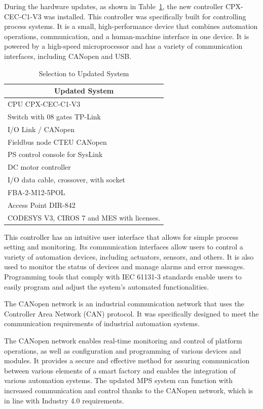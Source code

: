 \documentclass[journal]{IEEEtran}
\begin{document}
During the hardware updates, as shown in Table~\ref{tab:step3}, the new controller CPX-CEC-C1-V3 was installed. This controller was specifically built for controlling process systems. It is a small, high-performance device that combines automation operations, communication, and a human-machine interface in one device. It is powered by a high-speed microprocessor and has a variety of communication interfaces, including CANopen and USB.

\begin{table}[]
\caption{Selection to Updated System}
\label{tab:step3}
\begin{tabular}{l}
\hline
\multicolumn{1}{c}{\textbf{Updated System}} \\ \hline
CPU CPX-CEC-C1-V3                           \\
Switch with 08 gates TP-Link                \\
I/O Link / CANopen                          \\
Fieldbus node CTEU CANopen                  \\
PS control console for SysLink              \\
DC motor controller                         \\
I/O data cable, crossover, with socket      \\
FBA-2-M12-5POL                              \\
Access Point DIR-842                        \\
CODESYS V3, CIROS 7 and MES with licenses.  \\ \hline
\end{tabular}
\end{table}

This controller has an intuitive user interface that allows for simple process setting and monitoring. Its communication interfaces allow users to control a variety of automation devices, including actuators, sensors, and others. It is also used to monitor the status of devices and manage alarms and error messages. Programming tools that comply with IEC 61131-3 standards enable users to easily program and adjust the system's automated functionalities.

The CANopen network is an industrial communication network that uses the Controller Area Network (CAN) protocol. It was specifically designed to meet the communication requirements of industrial automation systems.

The CANopen network enables real-time monitoring and control of platform operations, as well as configuration and programming of various devices and modules. It provides a secure and effective method for assuring communication between various elements of a smart factory and enables the integration of various automation systems. The updated MPS system can function with increased communication and control thanks to the CANopen network, which is in line with Industry 4.0 requirements.
\end{document}
